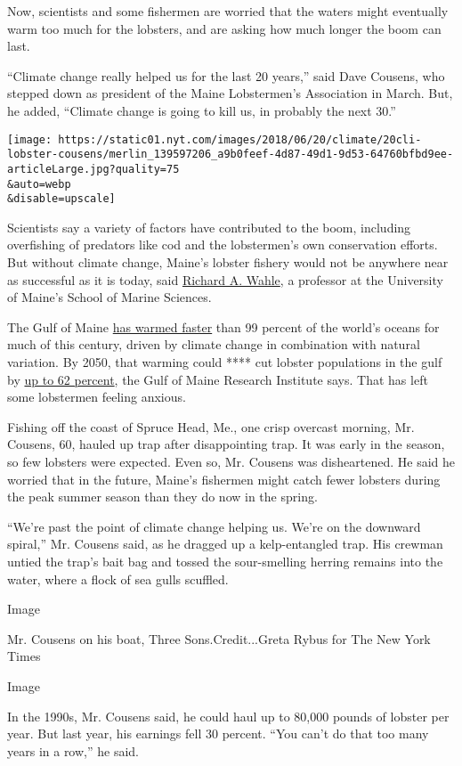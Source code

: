 Now, scientists and some fishermen are worried that the waters might
eventually warm too much for the lobsters, and are asking how much
longer the boom can last.

``Climate change really helped us for the last 20 years,'' said Dave
Cousens, who stepped down as president of the Maine Lobstermen's
Association in March. But, he added, ``Climate change is going to kill
us, in probably the next 30.''

\texttt{[image: https://static01.nyt.com/images/2018/06/20/climate/20cli-lobster-cousens/merlin\_139597206\_a9b0feef-4d87-49d1-9d53-64760bfbd9ee-articleLarge.jpg?quality=75\\\&auto=webp\\\&disable=upscale]}

Scientists say a variety of factors have contributed to the boom,
including overfishing of predators like cod and the lobstermen's own
conservation efforts. But without climate change, Maine's lobster
fishery would not be anywhere near as successful as it is today, said
\href{https://umaine.edu/wahlelab/}{Richard A. Wahle}, a professor at
the University of Maine's School of Marine Sciences.

The Gulf of Maine
\href{http://science.sciencemag.org/content/350/6262/809}{has warmed
faster} than 99 percent of the world's oceans for much of this century,
driven by climate change in combination with natural variation. By 2050,
that warming could **** cut lobster populations in the gulf by
\href{http://www.pnas.org/content/115/8/1831}{up to 62 percent}, the
Gulf of Maine Research Institute says. That has left some lobstermen
feeling anxious.

Fishing off the coast of Spruce Head, Me., one crisp overcast morning,
Mr. Cousens, 60, hauled up trap after disappointing trap. It was early
in the season, so few lobsters were expected. Even so, Mr. Cousens was
disheartened. He said he worried that in the future, Maine's fishermen
might catch fewer lobsters during the peak summer season than they do
now in the spring.

``We're past the point of climate change helping us. We're on the
downward spiral,'' Mr. Cousens said, as he dragged up a kelp-entangled
trap. His crewman untied the trap's bait bag and tossed the
sour-smelling herring remains into the water, where a flock of sea gulls
scuffled.

Image

Mr. Cousens on his boat, Three Sons.Credit...Greta Rybus for The New
York Times

Image

In the 1990s, Mr. Cousens said, he could haul up to 80,000 pounds of
lobster per year. But last year, his earnings fell 30 percent. ``You
can't do that too many years in a row,'' he said.

